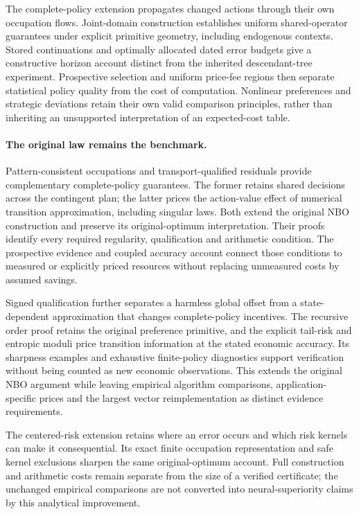 \documentclass[ecta,nameyear,draft]{econsocart}
\begin{document}
The complete-policy extension propagates changed actions through their own occupation flows. Joint-domain construction establishes uniform shared-operator guarantees under explicit primitive geometry, including endogenous contexts. Stored continuations and optimally allocated dated error budgets give a constructive horizon account distinct from the inherited descendant-tree experiment. Prospective selection and uniform price-fee regions then separate statistical policy quality from the cost of computation. Nonlinear preferences and strategic deviations retain their own valid comparison principles, rather than inheriting an unsupported interpretation of an expected-cost table.


\paragraph{The original law remains the benchmark.}
Pattern-consistent occupations and transport-qualified residuals provide complementary complete-policy guarantees. The former retains shared decisions across the contingent plan; the latter prices the action-value effect of numerical transition approximation, including singular laws. Both extend the original NBO construction and preserve its original-optimum interpretation. Their proofs identify every required regularity, qualification and arithmetic condition. The prospective evidence and coupled accuracy account connect those conditions to measured or explicitly priced resources without replacing unmeasured costs by assumed savings.


Signed qualification further separates a harmless global offset from a state-dependent approximation that changes complete-policy incentives. The recursive order proof retains the original preference primitive, and the explicit tail-risk and entropic moduli price transition information at the stated economic accuracy. Its sharpness examples and exhaustive finite-policy diagnostics support verification without being counted as new economic observations. This extends the original NBO argument while leaving empirical algorithm comparisons, application-specific prices and the largest vector reimplementation as distinct evidence requirements.


The centered-risk extension retains where an error occurs and which risk kernels can make it consequential. Its exact finite occupation representation and safe kernel exclusions sharpen the same original-optimum account. Full construction and arithmetic costs remain separate from the size of a verified certificate; the unchanged empirical comparisons are not converted into neural-superiority claims by this analytical improvement.
\end{document}
